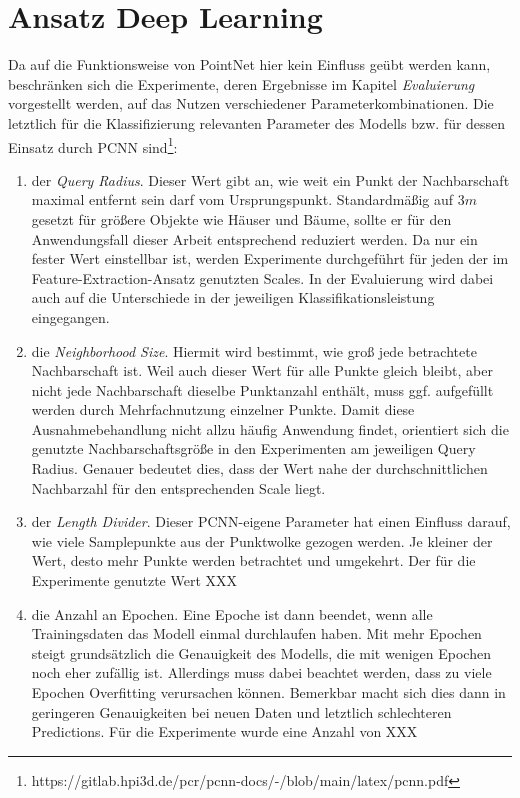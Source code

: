 
\section{Ansatz Deep Learning} 

Da auf die Funktionsweise von PointNet hier kein Einfluss geübt werden kann, beschränken sich die Experimente, deren Ergebnisse im Kapitel \textit{Evaluierung} vorgestellt werden, auf das Nutzen verschiedener Parameterkombinationen. Die letztlich für die Klassifizierung relevanten Parameter des Modells bzw. für dessen Einsatz durch PCNN sind\footnote{https://gitlab.hpi3d.de/pcr/pcnn-docs/-/blob/main/latex/pcnn.pdf}:
\begin{enumerate}
    \item der \textit{Query Radius}. Dieser Wert gibt an, wie weit ein Punkt der Nachbarschaft maximal entfernt sein darf vom Ursprungspunkt. Standardmäßig auf 3$m$ gesetzt für größere Objekte wie Häuser und Bäume, sollte er für den Anwendungsfall dieser Arbeit entsprechend reduziert werden. Da nur ein fester Wert einstellbar ist, werden Experimente durchgeführt für jeden der im Feature-Extraction-Ansatz genutzten Scales. In der Evaluierung wird dabei auch auf die Unterschiede in der jeweiligen Klassifikationsleistung eingegangen. 
    \item die \textit{Neighborhood Size}. Hiermit wird bestimmt, wie groß jede betrachtete Nachbarschaft ist. Weil auch dieser Wert für alle Punkte gleich bleibt, aber nicht jede Nachbarschaft dieselbe Punktanzahl enthält, muss ggf. aufgefüllt werden durch Mehrfachnutzung einzelner Punkte. Damit diese Ausnahmebehandlung nicht allzu häufig Anwendung findet, orientiert sich die genutzte Nachbarschaftsgröße in den Experimenten am jeweiligen Query Radius. Genauer bedeutet dies, dass der Wert nahe der durchschnittlichen Nachbarzahl für den entsprechenden Scale liegt.
    \item der \textit{Length Divider}. Dieser PCNN-eigene Parameter hat einen Einfluss darauf, wie viele Samplepunkte aus der Punktwolke gezogen werden. Je kleiner der Wert, desto mehr Punkte werden betrachtet und umgekehrt. Der für die Experimente genutzte Wert XXX
    \item die Anzahl an Epochen. Eine Epoche ist dann beendet, wenn alle Trainingsdaten das Modell einmal durchlaufen haben. Mit mehr Epochen steigt grundsätzlich die Genauigkeit des Modells, die mit wenigen Epochen noch eher zufällig ist. Allerdings muss dabei beachtet werden, dass zu viele Epochen Overfitting verursachen können. Bemerkbar macht sich dies dann in geringeren Genauigkeiten bei neuen Daten und letztlich schlechteren Predictions. Für die Experimente wurde eine Anzahl von XXX
\end{enumerate} 

